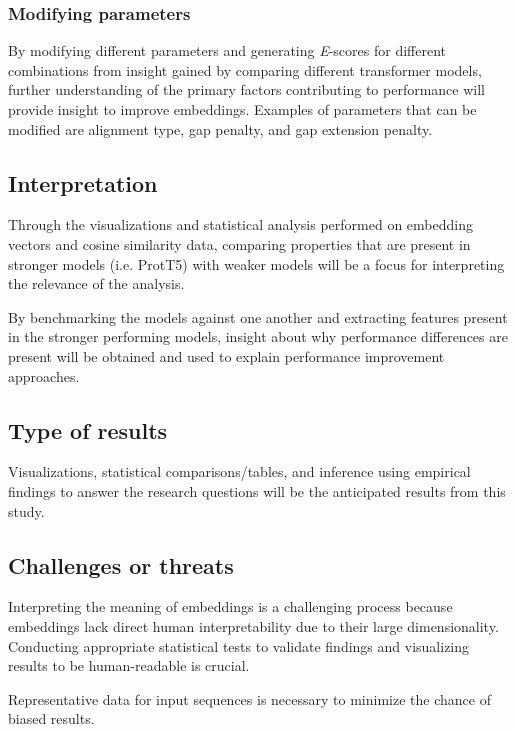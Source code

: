 \documentclass[
	letterpaper, %
	10pt, %
]{journalArticle}
\begin{document}
\subsubsection{Modifying parameters}

By modifying different parameters and generating \textit{E}-scores for different combinations from insight gained by comparing different transformer models, further understanding of the primary factors contributing to performance will provide insight to improve embeddings. Examples of parameters that can be modified are alignment type, gap penalty, and gap extension penalty.

\subsection{Interpretation}
Through the visualizations and statistical analysis performed on embedding vectors and cosine similarity data, comparing properties that are present in stronger models (i.e. ProtT5) with weaker models will be a focus for interpreting the relevance of the analysis.

By benchmarking the models against one another and extracting features present in the stronger performing models, insight about why performance differences are present will be obtained and used to explain performance improvement approaches.

\subsection{Type of results}
Visualizations, statistical comparisons/tables, and inference using empirical findings to answer the research questions will be the anticipated results from this study.

\subsection{Challenges or threats}
Interpreting the meaning of embeddings is a challenging process because embeddings lack direct human interpretability due to their large dimensionality. Conducting appropriate statistical tests to validate findings and visualizing results to be human-readable is crucial.

Representative data for input sequences is necessary to minimize the chance of biased results.

\end{document}
